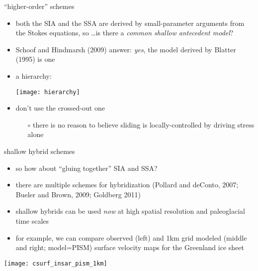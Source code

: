 \begin{frame}{``higher-order'' schemes}

\begin{itemize}
\item both the SIA and the SSA are derived by small-parameter arguments from the Stokes equations, so \dots is there a \emph{common shallow antecedent model}?
\item Schoof and Hindmarsh (2009) answer:  \emph{yes}, the model derived by Blatter (1995) is one
\item a hierarchy:
\begin{center}
\texttt{[image: hierarchy]}
\end{center}
\item don't use the crossed-out one
  \begin{itemize}
  \item[$\circ$] there is no reason to believe sliding is locally-controlled by driving stress alone
  \end{itemize}
\end{itemize}
\end{frame}


\begin{frame}{shallow hybrid schemes}

\begin{itemize}
\item so how about ``gluing together'' SIA and SSA?
\item there are multiple schemes for hybridization (Pollard and deConto, 2007\nocite{PollardDeConto}; Bueler and Brown, 2009\nocite{BBssasliding}; Goldberg 2011\nocite{Goldberg2011})
\item shallow hybrids can be used \emph{now} at high spatial resolution and paleoglacial time scales
\item for example, we can compare observed (left) and 1km grid modeled (middle and right; model=PISM) surface velocity maps for the Greenland ice sheet
\end{itemize}

\vspace{-4mm}
\begin{center}
\texttt{[image: csurf\_insar\_pism\_1km]}
\end{center}
\end{frame}


